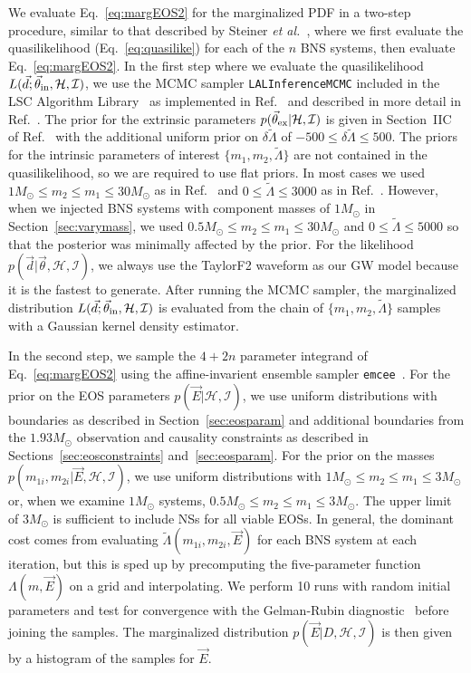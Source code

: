\documentclass[twocolumn,prd,amssymb,aps,nofootinbib,showpacs,epsf]{revtex4}
\begin{document}
We evaluate Eq.~\eqref{eq:margEOS2} for the marginalized PDF in a two-step procedure, similar to that described by Steiner {\it et al.}~\cite{SteinerLattimerBrown2010}, where we first evaluate the quasilikelihood (Eq.~\eqref{eq:quasilike}) for each of the $n$ BNS systems, then evaluate Eq.~\eqref{eq:margEOS2}. In the first step where we evaluate the quasilikelihood $L(\vec d; \vec\theta_{\rm in}, \mathcal{H}, \mathcal{I})$, we use the MCMC sampler \texttt{LALInferenceMCMC} included in the LSC Algorithm Library~\cite{lal} as implemented in Ref.~\cite{WadeCreightonOchsner2014} and described in more detail in Ref.~\cite{VeitchRaymondFarr2014}. The prior for the extrinsic parameters $p(\vec\theta_{\rm ex} | \mathcal{H}, \mathcal{I})$ is given in Section~IIC of Ref.~\cite{VeitchRaymondFarr2014} with the additional uniform prior on $\delta\tilde\Lambda$ of $-500 \le \delta\tilde\Lambda \le 500$. The priors for the intrinsic parameters of interest $\{m_{1}, m_{2}, \tilde\Lambda\}$ are not contained in the quasilikelihood, so we are required to use flat priors. In most cases we used $1M_\odot \le m_2 \le m_1 \le 30M_\odot$ as in Ref.~\cite{VeitchRaymondFarr2014} and $0 \le \tilde\Lambda \le 3000$ as in Ref.~\cite{WadeCreightonOchsner2014}. However, when we injected BNS systems with component masses of $1M_\odot$ in Section~\ref{sec:varymass}, we used $0.5M_\odot \le m_2 \le m_1 \le 30M_\odot$ and $0 \le \tilde\Lambda \le 5000$ so that the posterior was minimally affected by the prior. For the likelihood $p(\vec d | \vec\theta, \mathcal{H}, \mathcal{I})$, we always use the TaylorF2 waveform as our GW model because it is the fastest to generate. After running the MCMC sampler, the marginalized distribution $L(\vec d; \vec\theta_{\rm in}, \mathcal{H}, \mathcal{I})$ is evaluated from the chain of $\{m_{1}, m_{2}, \tilde\Lambda\}$ samples with a Gaussian kernel density estimator.

In the second step, we sample the $4+2n$ parameter integrand of Eq.~\eqref{eq:margEOS2} using the affine-invarient ensemble sampler \texttt{emcee}~\cite{ForemanMackeyHogg2013}. For the prior on the EOS parameters $p(\vec E | \mathcal{H},\mathcal{I})$, we use uniform distributions with boundaries as described in Section~\ref{sec:eosparam} and additional boundaries from the $1.93M_\odot$ observation and causality constraints as described in Sections~\ref{sec:eosconstraints} and~\ref{sec:eosparam}. For the prior on the masses $p(m_{1i}, m_{2i} | \vec E, \mathcal{H},\mathcal{I})$, we use uniform distributions with $1M_\odot \le m_2 \le m_1 \le 3M_\odot$ or, when we examine $1M_\odot$ systems, $0.5M_\odot \le m_2 \le m_1 \le 3M_\odot$. The upper limit of $3M_\odot$ is sufficient to include NSs for all viable EOSs. In general, the dominant cost comes from evaluating $\tilde\Lambda(m_{1i}, m_{2i}, \vec E)$ for each BNS system at each iteration, but this is sped up by precomputing the five-parameter function $\Lambda(m, \vec E)$ on a grid and interpolating. We perform 10 runs with random initial parameters and test for convergence with the Gelman-Rubin diagnostic~\cite{GelmanRubin1992} before joining the samples. 
The marginalized distribution $p(\vec E|D, \mathcal{H}, \mathcal{I})$ is then given by a histogram of the samples for $\vec E$.
\end{document}
